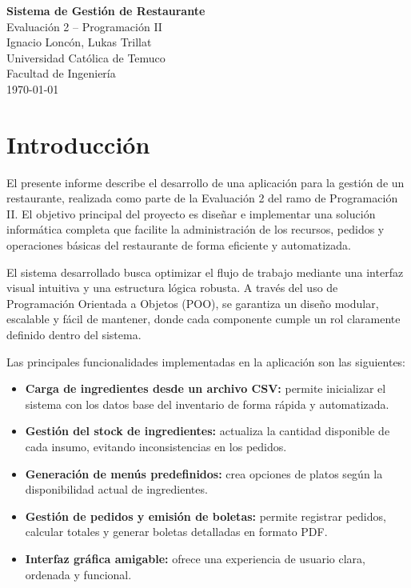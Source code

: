 \documentclass[12pt,a4paper]{article}
\begin{document}
\begin{titlepage}
    \centering
    \vspace*{4cm}
    {\Huge \textbf{Sistema de Gestión de Restaurante}}\\[0.5cm]
    Evaluación 2 – Programación II\\
    Ignacio Loncón, Lukas Trillat\\
    Universidad Católica de Temuco\\
    Facultad de Ingeniería\\
    \today
\end{titlepage}

\tableofcontents

\newpage

\section{Introducción}

El presente informe describe el desarrollo de una aplicación para la gestión de un restaurante, realizada como parte de la Evaluación 2 del ramo de Programación II. El objetivo principal del proyecto es diseñar e implementar una solución informática completa que facilite la administración de los recursos, pedidos y operaciones básicas del restaurante de forma eficiente y automatizada.

\bigskip

El sistema desarrollado busca optimizar el flujo de trabajo mediante una interfaz visual intuitiva y una estructura lógica robusta. A través del uso de Programación Orientada a Objetos (POO), se garantiza un diseño modular, escalable y fácil de mantener, donde cada componente cumple un rol claramente definido dentro del sistema.

\bigskip

Las principales funcionalidades implementadas en la aplicación son las siguientes:
\begin{itemize}
    \item \textbf{Carga de ingredientes desde un archivo CSV:} permite inicializar el sistema con los datos base del inventario de forma rápida y automatizada.
    \item \textbf{Gestión del stock de ingredientes:} actualiza la cantidad disponible de cada insumo, evitando inconsistencias en los pedidos.
    \item \textbf{Generación de menús predefinidos:} crea opciones de platos según la disponibilidad actual de ingredientes.
    \item \textbf{Gestión de pedidos y emisión de boletas:} permite registrar pedidos, calcular totales y generar boletas detalladas en formato PDF.
    \item \textbf{Interfaz gráfica amigable:} ofrece una experiencia de usuario clara, ordenada y funcional.
\end{itemize}
\end{document}
